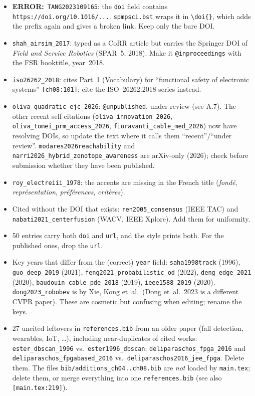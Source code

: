 \documentclass[10pt,a4paper]{article}
\newcommand{\src}[1]{{\footnotesize\texttt{[#1]}}}
\newcommand{\err}{\textbf{ERROR:}~}
\newcommand{\key}[1]{\texttt{#1}}
\begin{document}
\begin{itemize}
\item \err \key{TANG2023109165}: the \texttt{doi} field contains \texttt{https://doi.org/10.1016/...}. \texttt{spmpsci.bst} wraps it in \verb|\doi{}|, which adds the prefix again and gives a broken link. Keep only the bare DOI.
\item \key{shah\_airsim\_2017}: typed as a CoRR article but carries the Springer DOI of \emph{Field and Service Robotics} (SPAR~5, 2018). Make it \verb|@inproceedings| with the FSR booktitle, year~2018.
\item \key{iso26262\_2018}: cites Part~1 (Vocabulary) for ``functional safety of electronic systems'' \src{ch08:101}; cite the ISO~26262:2018 series instead.
\item \key{oliva\_quadratic\_ejc\_2026}: \verb|@unpublished|, under review (see A.7). The other recent self-citations (\key{oliva\_innovation\_2026}, \key{oliva\_tomei\_prm\_access\_2026}, \key{fioravanti\_cable\_med\_2026}) now have resolving DOIs, so update the text where it calls them ``recent''/``under review''. \key{modares2026reachability} and \key{narri2026\_hybrid\_zonotope\_awareness} are arXiv-only (2026); check before submission whether they have been published.
\item \key{roy\_electreiii\_1978}: the accents are missing in the French title (\emph{fond\'e}, \emph{repr\'esentation}, \emph{pr\'ef\'erences}, \emph{crit\`eres}).
\item Cited without the DOI that exists: \key{ren2005\_consensus} (IEEE TAC) and \key{nabati2021\_centerfusion} (WACV, IEEE Xplore). Add them for uniformity.
\item 50 entries carry both \texttt{doi} and \texttt{url}, and the style prints both. For the published ones, drop the \texttt{url}.
\item Key years that differ from the (correct) \texttt{year} field: \key{saha1998track} (1996), \key{guo\_deep\_2019} (2021), \key{feng2021\_probabilistic\_od} (2022), \key{deng\_edge\_2021} (2020), \key{baudouin\_cable\_pde\_2018} (2019), \key{ieee1588\_2019} (2020). \key{dong2023\_robobev} is by Xie, Kong et~al.\ (Dong et~al.\ 2023 is a different CVPR paper). These are cosmetic but confusing when editing; rename the keys.
\item 27 uncited leftovers in \texttt{references.bib} from an older paper (fall detection, wearables, IoT, \ldots), including near-duplicates of cited works: \key{ester\_dbscan\_1996} vs.\ \key{ester1996\_dbscan}; \key{deliparaschos\_fpga\_2016} and \key{deliparaschos\_fpgabased\_2016} vs.\ \key{deliparaschos2016\_jee\_fpga}. Delete them. The files \texttt{bib/additions\_ch04..ch08.bib} are \emph{not} loaded by \texttt{main.tex}; delete them, or merge everything into one \texttt{references.bib} (see also \src{main.tex:219}).

\end{itemize}
\end{document}
